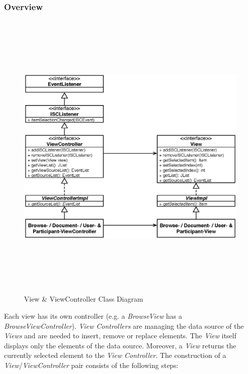 \subsubsection{Overview}
\begin{figure}[H]
\begin{center}
  \includegraphics[height=5.62in, width=7.19in]{../images/finalreport/application_views_controllers.eps}
\caption{View \& ViewController Class Diagram}
\label{application_views_controllers}
\end{center}
\end{figure}

Each view has its own controller (e.g. a \textit{BrowseView} has a \textit{BrowseViewController}). \textit{View Controllers} are managing the data source of the \textit{Views} and are needed to insert, remove or replace elements. The \textit{View} itself displays only the elements of the data source. Moreover, a \textit{View} returns the currently selected element to the \textit{View Controller}. The construction of a \emph{View}/\emph{ViewController} pair consists of the following steps:

